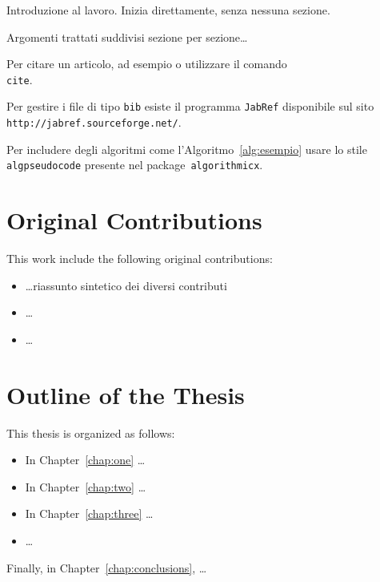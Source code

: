 Introduzione al lavoro. Inizia direttamente, senza nessuna sezione.

\noindent Argomenti trattati suddivisi sezione per sezione\dots

\noindent Per citare un articolo, ad esempio \cite{book:projpa2} o \cite{online:azuretable, online:datastore} utilizzare il comando \texttt{\\cite}. 

\noindent Per gestire i file di tipo \texttt{bib} esiste il programma \texttt{JabRef} disponibile sul sito \texttt{http://jabref.sourceforge.net/}.

\noindent Per includere degli algoritmi come l'Algoritmo~\ref{alg:esempio}
usare lo stile \texttt{algpseudocode} presente nel package~\texttt{algorithmicx}.

\section*{Original Contributions}
This work include the following original contributions:
\begin{itemize}
\item \dots riassunto sintetico dei diversi contributi
\item \dots
\item \dots
\end{itemize}

\section*{Outline of the Thesis}
This thesis is organized as follows: 
\begin{itemize}
\item In Chapter~\ref{chap:one} \dots
\item In Chapter~\ref{chap:two} \dots
\item In Chapter~\ref{chap:three} \dots
\item \dots
\end{itemize}
Finally, in Chapter~\ref{chap:conclusions}, \dots


